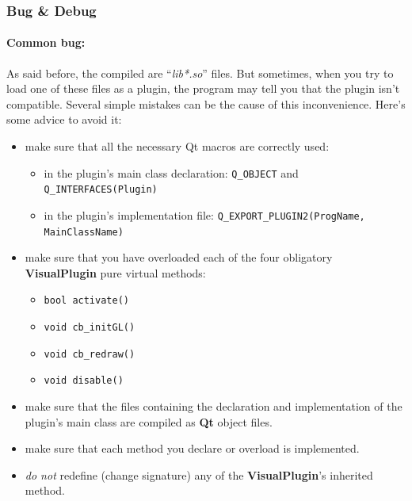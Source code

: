 \documentclass[a4paper]{scrreprt}
\begin{document}
	\subsubsection{Bug \& Debug}
	\paragraph{Common bug:}
	As said before, the compiled are ``\textit{lib*.so}'' files. But sometimes,
	when you try to load one of these files as a plugin, the program may tell you
	that the plugin isn't compatible. Several simple mistakes can be the cause of
	this inconvenience. Here's some advice to avoid it:
	\begin{itemize}
	  \item make sure that all the necessary Qt macros are correctly used:
	  	\begin{itemize}
	   		\item in the plugin's main class declaration:
	  		\texttt{Q\_OBJECT} and \texttt{Q\_INTERFACES(Plugin)}
	  		\item in the plugin's implementation file:
	  		\texttt{Q\_EXPORT\_PLUGIN2(ProgName, MainClassName)}
		\end{itemize}
		\item make sure that you have overloaded each of the four obligatory
		\textbf{VisualPlugin} pure virtual methods:
		\begin{itemize}
		  	\item \texttt{bool activate()}
		  	\item \texttt{void cb\_initGL()}
		  	\item \texttt{void cb\_redraw()}
		  	\item \texttt{void disable()}
		\end{itemize}
		\item make sure that the files containing the declaration and implementation
		of the plugin's main class are compiled as \textbf{Qt} object files.
		\item make sure that each method you declare or overload is
		implemented.
		\item {\em{do not}} redefine (change signature) any of the
		\textbf{VisualPlugin}'s inherited method.
	\end{itemize}
	
\end{document}
